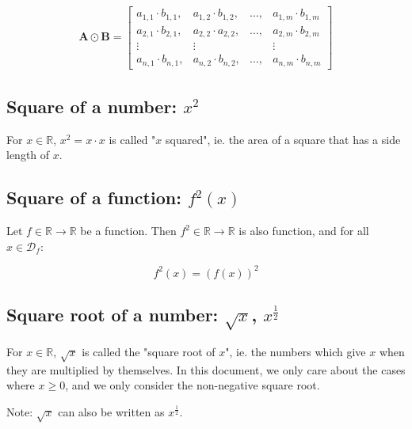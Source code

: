 \documentclass[titlepage]{article}
\begin{document}
        \begin{align*}
          \mathbf{A} \odot \mathbf{B}
            = \begin{bmatrix}
                a_{1,1} \cdot b_{1,1},
                  & a_{1,2} \cdot b_{1,2},
                  & \ldots,
                  & a_{1,m} \cdot b_{1,m} \\
                a_{2,1} \cdot b_{2,1},
                  & a_{2,2} \cdot a_{2,2},
                  & \ldots,
                  & a_{2,m} \cdot b_{2,m}\\
                \vdots & \vdots & & \vdots \\
                a_{n,1} \cdot b_{n,1},
                  & a_{n,2} \cdot b_{n,2},
                  & \ldots,
                  & a_{n,m} \cdot b_{n,m}
              \end{bmatrix}
        \end{align*}

      \subsection{Square of a number: $x^2$}

        For $x \in \mathbb{R}$, $x^2 = x \cdot x$ is called "$x$ squared", ie.
        the area of a square that has a side length of $x$.

      \subsection{Square of a function: $f^2(x)$}

        Let $f \in \mathbb{R} \rightarrow \mathbb{R}$ be a function. Then
        $f^2 \in \mathbb{R} \rightarrow \mathbb{R}$ is also function, and for
        all $x \in \mathcal{D}_f$:

        $$f^2(x) = \left( f(x) \right)^2$$

      \subsection{Square root of a number: $\sqrt{x}$, $x^\frac{1}{2}$}

        For $x \in \mathbb{R}$, $\sqrt{x}$ is called the "square root of $x$",
        ie. the numbers which give $x$ when they are multiplied by
        themselves. In this document, we only care about the cases where
        $x \geq 0$, and we only consider the non-negative square root.

        Note: $\sqrt{x}$ can also be written as $x^\frac{1}{2}$.
\end{document}
